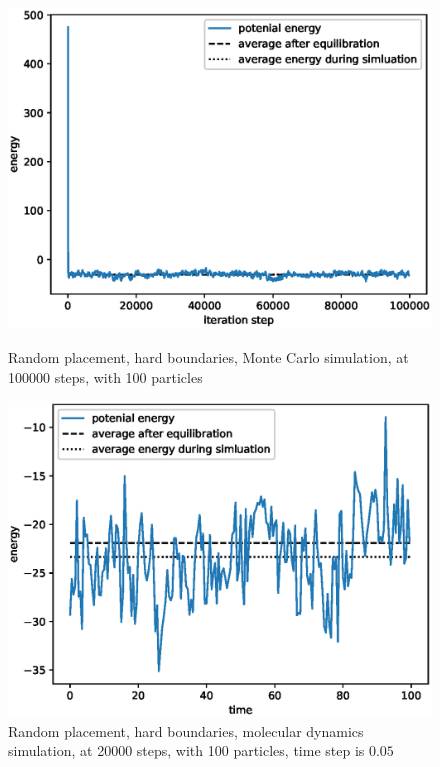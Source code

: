 \documentclass[UTF8,a4paper]{article}
\begin{document}
\begin{figure}[H]
	\centering
	\begin{minipage}[t]{0.45\textwidth}
		\centering
		\includegraphics[height=0.2\textheight]{fig/exp2_rand_hard_mc.eps}
		\caption{Random placement, hard boundaries, Monte Carlo simulation, at 100000 steps, with 100 particles}
	\end{minipage}\hspace{0.5cm}
	\begin{minipage}[t]{0.45\textwidth}
		\centering
		\includegraphics[height=0.2\textheight]{fig/exp2_rand_hard_md.eps}
		\caption{Random placement, hard boundaries, molecular dynamics simulation, at 20000 steps, with 100 particles, time step is $0.05$}
	\end{minipage}
\end{figure}
\end{document}
